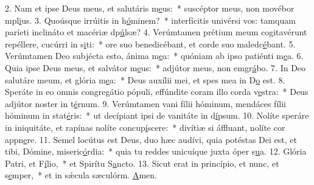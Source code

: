 2. Nam et ipse Deus meus, et salutáris m\uline{e}us:~* suscéptor meus, non movébor mpl\uline{i}us.
3. Quoúsque irrúitis in h\uline{ó}minem?~* interfícitis univérsi vos: tamquam paríeti inclináto et macériæ dp\uline{ú}lsæ?
4. Verúmtamen prétium meum cogitavérunt repéllere, cucúrri in s\uline{i}ti:~* ore suo benedicébant, et corde suo maledc\uline{é}bant.
5. Verúmtamen Deo subjécta esto, ánima m\uline{e}a:~* quóniam ab ipso patiénti m\uline{e}a.
6. Quia ipse Deus meus, et salvátor m\uline{e}us:~* adjútor meus, non emgr\uline{á}bo.
7. In Deo salutáre meum, et glória m\uline{e}a:~* Deus auxílii mei, et spes mea in D\uline{o} est.
8. Speráte in eo omnis congregátio pópuli, effúndite coram illo corda v\uline{e}stra:~* Deus adjútor noster in t\uline{é}rnum.
9. Verúmtamen vani fílii hóminum, mendáces fílii hóminum in stat\uline{é}ris:~* ut decípiant ipsi de vanitáte in d\uline{í}psum.
10. Nolíte speráre in iniquitáte, et rapínas nolíte concup\uline{í}scere:~* divítiæ si áffluant, nolíte cor appn\uline{e}re.
11. Semel locútus est Deus, duo hæc audívi, quia potéstas Dei est, et tibi, Dómine, miseric\uline{ó}rdia:~* quia tu reddes unicuíque juxta óper s\uline{u}a.
12. Glória Patri, et F\uline{í}lio,~* et Spirítu S\uline{a}ncto.
13. Sicut erat in princípio, et nunc, et s\uline{e}mper,~* et in sǽcula sæculórm. \uline{A}men.

